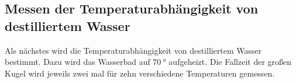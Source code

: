 \subsection{Messen der Temperaturabhängigkeit von destilliertem Wasser}
Als nächstes wird die Temperaturabhängigkeit von destilliertem Wasser bestimmt. 
Dazu wird das Wasserbad auf $\SI{70}{\degree}$ aufgeheizt. Die Fallzeit der großen Kugel wird jeweils zwei mal 
für zehn verschiedene Temperaturen gemessen. 

